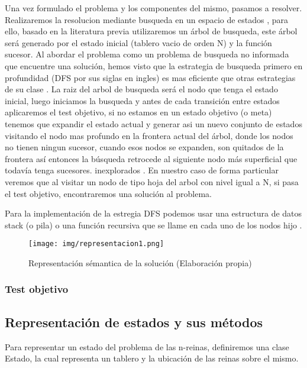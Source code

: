 \documentclass[conference]{IEEEtran}
\begin{document}
Una vez formulado el problema y los componentes del mismo, pasamos a resolver. Realizaremos la resolucion mediante busqueda en un espacio de estados \cite{r2}, para ello, basado en la literatura previa utilizaremos un árbol de busqueda, este árbol será generado por el estado inicial (tablero vacio de orden N) y la función sucesor. Al abordar el problema como un problema de busqueda no informada que encuentre una solución, hemos visto que la estrategia de busqueda primero en profundidad (DFS por sus siglas en ingles) es mas eficiente que otras estrategias de su clase \cite{r3_bfs_dfs}. La raiz del arbol de busqueda será el nodo que tenga el estado inicial, luego iniciamos la busqueda y antes de cada transición entre estados aplicaremos el test objetivo, si no estamos en un estado objetivo (o meta) tenemos que expandir el estado actual y generar asi un nuevo conjunto de estados visitando el nodo mas profundo en la frontera actual del árbol, donde los nodos no tienen ningun sucesor, cuando esos nodos se expanden, son quitados de la frontera así entonces la búsqueda retrocede al siguiente nodo más superficial que todavía tenga sucesores. inexplorados \cite{r2}. En nuestro caso de forma particular veremos que al visitar un nodo de tipo hoja del arbol con nivel igual a N, si pasa el test objetivo, encontraremos una solución al problema.

Para la implementación de la estregia DFS podemos usar una estructura de datos stack (o pila) o una función recursiva que se llame en cada uno de los nodos hijo \cite{r2}.

\begin{figure}[h]
    \centering
    \texttt{[image: img/representacion1.png]}
    \caption{Representación sémantica de la solución (Elaboración propia)}
    \label{fig:ontologia3}
\end{figure} 

\subsubsection{Test objetivo}\label{AA_6}

\subsection{Representación de estados y sus métodos}
Para representar un estado del problema de las n-reinas, definiremos una clase Estado, la cual representa un tablero y la ubicación de las reinas sobre el mismo.
\end{document}
